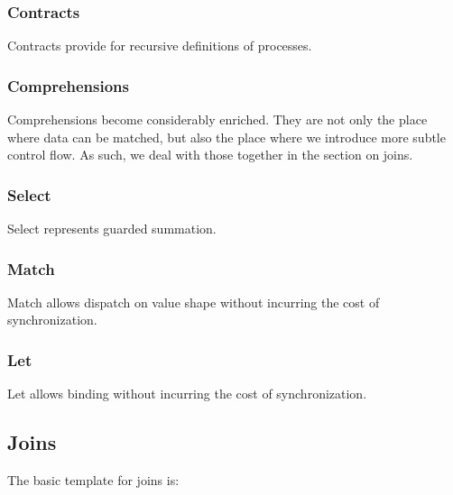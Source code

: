 \subsubsection{Contracts}

Contracts provide for recursive definitions of processes.

\subsubsection{Comprehensions}

Comprehensions become considerably enriched. They are not only the
place where data can be matched, but also the place where we introduce
more subtle control flow. As such, we deal with those together in the
section on joins.

\subsubsection{Select}

Select represents guarded summation.

\subsubsection{Match}

Match allows dispatch on value shape without incurring the cost of synchronization.

\subsubsection{Let}

Let allows binding without incurring the cost of synchronization.


\subsection{Joins}

The basic template for joins is:


